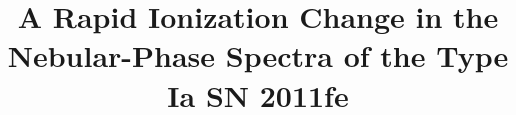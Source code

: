 \documentclass[twocolumn]{aastex63}
\begin{document}
\title{A Rapid Ionization Change in the Nebular-Phase Spectra of the Type Ia SN 2011fe}


\end{document}
